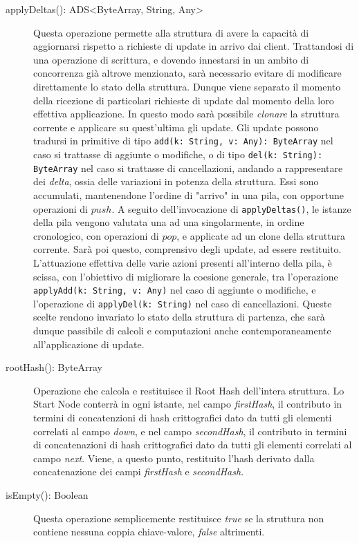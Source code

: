 \begin{description}
		\item[applyDeltas(): ADS<ByteArray, String, Any>] Questa operazione permette alla struttura di avere la capacità di aggiornarsi rispetto a richieste di update in arrivo dai client. Trattandosi di una operazione di scrittura, e dovendo innestarsi in un ambito di concorrenza già altrove menzionato, sarà necessario evitare di modificare direttamente lo stato della struttura. Dunque viene separato il momento della ricezione di particolari richieste di update dal momento della loro effettiva applicazione. In questo modo sarà possibile \textit{clonare} la struttura corrente e applicare su quest'ultima gli update. Gli update possono tradursi in primitive di tipo \verb!add(k: String, v: Any): ByteArray! nel caso si trattasse di aggiunte o modifiche, o di tipo \verb!del(k: String): ByteArray! nel caso si trattasse di cancellazioni, andando a rappresentare dei \textit{delta}, ossia delle variazioni in potenza della struttura. Essi sono accumulati, mantenendone l'ordine di "arrivo" in una pila, con opportune operazioni di $ push $. A seguito dell'invocazione di \verb!applyDeltas()!, le istanze della pila vengono valutata una ad una singolarmente, in ordine cronologico, con operazioni di $ pop $, e applicate ad un clone della struttura corrente. Sarà poi questo, comprensivo degli update, ad essere restituito.
		L'attuazione effettiva delle varie azioni presenti all'interno della pila, è scissa, con l'obiettivo di migliorare la coesione generale, tra l'operazione \verb!applyAdd(k: String, v: Any)! nel caso di aggiunte o modifiche, e l'operazione di \verb!applyDel(k: String)! nel caso di cancellazioni.
		Queste scelte rendono invariato lo stato della struttura di partenza, che sarà dunque passibile di calcoli e computazioni anche contemporaneamente all'applicazione di update.
		
		\item[rootHash(): ByteArray] Operazione che calcola e restituisce il Root Hash dell'intera struttura. Lo Start Node conterrà in ogni istante, nel campo \textit{firstHash}, il contributo in termini di concatenzioni di hash crittografici dato da tutti gli elementi correlati al campo \textit{down}, e nel campo \textit{secondHash}, il contributo in termini di concatenazioni di hash crittografici dato da tutti gli elementi correlati al campo \textit{next}. Viene, a questo punto, restituito l'hash derivato dalla concatenazione dei campi \textit{firstHash} e \textit{secondHash}.
		
		\item[isEmpty(): Boolean] Questa operazione semplicemente restituisce \textit{true} se la struttura non contiene nessuna coppia chiave-valore, \textit{false} altrimenti.
		

\end{description}
